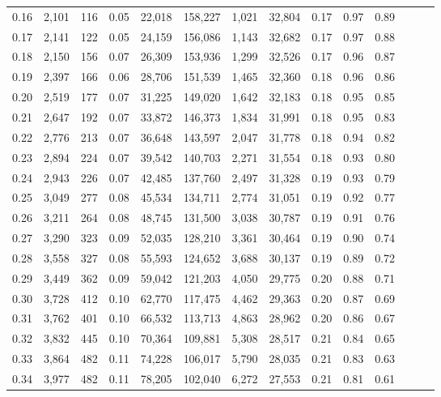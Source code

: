 \begin{tabular}{rrrrrrrrrrrrrr}
0.16 &  2,101 &  116 &  0.05 &   22,018 &  158,227 &   1,021 &  32,804 &  0.17 &  0.97 &      0.89 \\
0.17 &  2,141 &  122 &  0.05 &   24,159 &  156,086 &   1,143 &  32,682 &  0.17 &  0.97 &      0.88 \\
0.18 &  2,150 &  156 &  0.07 &   26,309 &  153,936 &   1,299 &  32,526 &  0.17 &  0.96 &      0.87 \\
0.19 &  2,397 &  166 &  0.06 &   28,706 &  151,539 &   1,465 &  32,360 &  0.18 &  0.96 &      0.86 \\
0.20 &  2,519 &  177 &  0.07 &   31,225 &  149,020 &   1,642 &  32,183 &  0.18 &  0.95 &      0.85 \\
0.21 &  2,647 &  192 &  0.07 &   33,872 &  146,373 &   1,834 &  31,991 &  0.18 &  0.95 &      0.83 \\
0.22 &  2,776 &  213 &  0.07 &   36,648 &  143,597 &   2,047 &  31,778 &  0.18 &  0.94 &      0.82 \\
0.23 &  2,894 &  224 &  0.07 &   39,542 &  140,703 &   2,271 &  31,554 &  0.18 &  0.93 &      0.80 \\
0.24 &  2,943 &  226 &  0.07 &   42,485 &  137,760 &   2,497 &  31,328 &  0.19 &  0.93 &      0.79 \\
0.25 &  3,049 &  277 &  0.08 &   45,534 &  134,711 &   2,774 &  31,051 &  0.19 &  0.92 &      0.77 \\
0.26 &  3,211 &  264 &  0.08 &   48,745 &  131,500 &   3,038 &  30,787 &  0.19 &  0.91 &      0.76 \\
0.27 &  3,290 &  323 &  0.09 &   52,035 &  128,210 &   3,361 &  30,464 &  0.19 &  0.90 &      0.74 \\
0.28 &  3,558 &  327 &  0.08 &   55,593 &  124,652 &   3,688 &  30,137 &  0.19 &  0.89 &      0.72 \\
0.29 &  3,449 &  362 &  0.09 &   59,042 &  121,203 &   4,050 &  29,775 &  0.20 &  0.88 &      0.71 \\
0.30 &  3,728 &  412 &  0.10 &   62,770 &  117,475 &   4,462 &  29,363 &  0.20 &  0.87 &      0.69 \\
0.31 &  3,762 &  401 &  0.10 &   66,532 &  113,713 &   4,863 &  28,962 &  0.20 &  0.86 &      0.67 \\
0.32 &  3,832 &  445 &  0.10 &   70,364 &  109,881 &   5,308 &  28,517 &  0.21 &  0.84 &      0.65 \\
0.33 &  3,864 &  482 &  0.11 &   74,228 &  106,017 &   5,790 &  28,035 &  0.21 &  0.83 &      0.63 \\
0.34 &  3,977 &  482 &  0.11 &   78,205 &  102,040 &   6,272 &  27,553 &  0.21 &  0.81 &      0.61 \\

\end{tabular}
